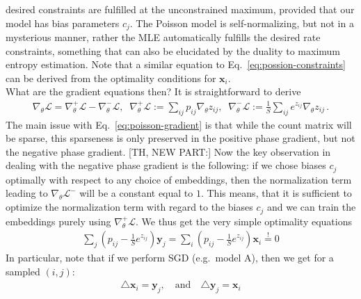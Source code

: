 \documentclass{article}
\newcommand{\logl}{{\mathcal L}}
\newcommand{\x}{{\mathbf x}}
\newcommand{\y}{{\mathbf y}}
\begin{document}
desired constraints are fulfilled at the unconstrained maximum, provided that our model has bias parameters $c_j$.  The Poisson model is self-normalizing, but not in a mysterious manner, rather the MLE automatically fulfills the desired rate constraints, something that can also be elucidated by the duality to maximum entropy estimation. Note that a similar equation to Eq.~\eqref{eq:possion-constraints} can be derived from the optimality conditions for $\x_i$. \\

What are the gradient equations then? It is straightforward to derive 
\begin{align}
\label{eq:poisson-gradient}
\nabla_\theta \logl = \nabla_\theta^+ \logl - \nabla_\theta^- \logl, 
\;\;  \nabla_\theta^+ \logl := \sum_{ij} p_{ij}  \nabla _\theta z_{ij}, 
\;\;  \nabla_\theta^- \logl :=  \frac 1S \sum_{ij} e^{z_{ij}} \nabla _\theta z_{ij}\,. 
\end{align}
The main issue with Eq.~\eqref{eq:poisson-gradient} is that while the count matrix will be sparse, this sparseness is only preserved in the positive phase gradient, but not the negative phase gradient. [TH, NEW PART:] Now the key observation in dealing with the negative phase gradient is the following: if we chose biases $c_j$ optimally with respect to any choice of embeddings, then the normalization term leading to $\nabla_\theta \logl^-$ will be a constant equal to $1$. This means, that it is sufficient to optimize the normalization term with regard to the biases $c_j$ and we can train the embeddings purely using $\nabla_\theta^+ \logl$. We thus get the very simple optimality equations
\begin{align}
\sum_j \left( p_{ij} -\frac 1S e^{z_{ij}}\right) \y_j = \sum_i \left(  p_{ij} -\frac 1S e^{z_{ij}}\right) \x_i \stackrel !=0 
\end{align}
In particular, note that if we perform SGD (e.g.~model A), then we get for a sampled $(i,j)$:
\begin{align}
\triangle \x_i =\y_j , \quad \text{and} \quad \triangle \y_j = \x_i
\end{align}



\newpage
\end{document}
